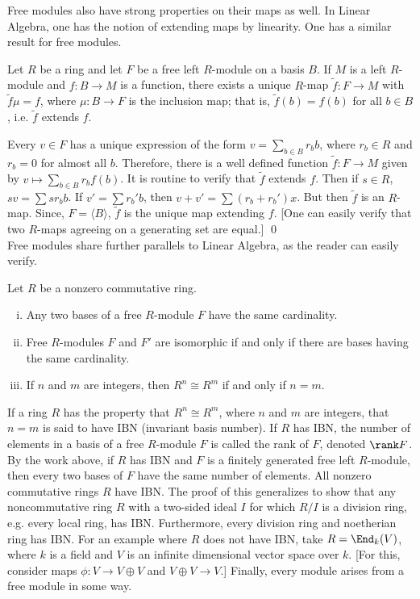 Free modules also have strong properties on their maps as well. In Linear Algebra, one has the notion of extending maps by linearity. One has a similar result for free modules.

\begin{prop} \label{prop:freemap}
Let $R$ be a ring and let $F$ be a free left $R$-module on a basis $B$. If $M$ is a left $R$-module and $f: B \to M$ is a function, there exists a unique $R$-map $\tilde{f}: F \to M$ with $\tilde{f}\mu=f$, where $\mu: B \to F$ is the inclusion map; that is, $\tilde{f}(b)=f(b)$ for all $b \in B$, i.e. $\tilde{f}$ extends $f$.
\end{prop}

\pf Every $v \in F$ has a unique expression of the form $v= \sum_{b \in B} r_bb$, where $r_b \in R$ and $r_b=0$ for almost all $b$. Therefore, there is a well defined function $\tilde{f}: F \to M$ given by $v \mapsto \sum_{b \in B} r_b f(b)$. It is routine to verify that $\tilde{f}$ extends $f$. Then if $s \in R$, $sv= \sum sr_bb$. If $v'= \sum r_b'b$, then $v+v'=\sum(r_b+r_b')x$. But then $\tilde{f}$ is an $R$-map. Since, $F= \langle B \rangle$, $\tilde{f}$ is the unique map extending $f$. [One can easily verify that two $R$-maps agreeing on a generating set are equal.] \qed \\

Free modules share further parallels to Linear Algebra, as the reader can easily verify. 

\begin{prop}
Let $R$ be a nonzero commutative ring.
	\begin{enumerate}[(i)]
	\item Any two bases of a free $R$-module $F$ have the same cardinality.
	\item Free $R$-modules $F$ and $F'$ are isomorphic if and only if there are bases having the same cardinality.
	\item If $n$ and $m$ are integers, then $R^n \cong R^m$ if and only if $n=m$. 
	\end{enumerate}
\end{prop}

If a ring $R$ has the property that $R^n \cong R^m$, where $n$ and $m$ are integers, that $n=m$ is said to have IBN (invariant basis number). If $R$ has IBN, the number of elements in a basis of a free $R$-module $F$ is called the rank of $F$, denoted $\rank F$. By the work above, if $R$ has IBN and $F$ is a finitely generated free left $R$-module, then every two bases of $F$ have the same number of elements. All nonzero commutative rings $R$ have IBN. The proof of this generalizes to show that any noncommutative ring $R$ with a two-sided ideal $I$ for which $R/I$ is a division ring, e.g. every local ring, has IBN. Furthermore, every division ring and noetherian ring has IBN. For an example where $R$ does not have IBN, take $R=\End_k(V)$, where $k$ is a field and $V$ is an infinite dimensional vector space over $k$. [For this, consider maps $\phi: V \to V \oplus V$ and $V \oplus V \to V$.] Finally, every module arises from a free module in some way.


